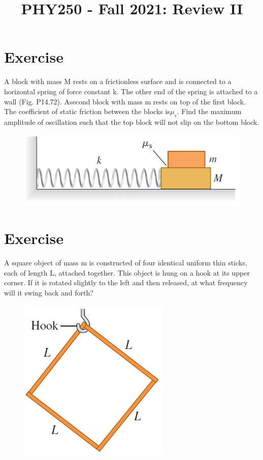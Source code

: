 \documentclass[12pt]{article}
\title{PHY250 - Fall 2021: Review II}
\author{}
\date{}
\begin{document}
\maketitle






\setcounter{example}{1}
\section*{Exercise \theexample}

A block with mass M rests on a frictionless surface
and is connected to a horizontal spring of force constant k. The
other end of the spring is attached to a wall (Fig. P14.72). Asecond
block with mass m rests on top of the first block. The coefficient of
static friction between the blocks is$\mu_s$. Find the maximum amplitude
of oscillation such that the top block will not slip on the bottom
block.

\begin{figure}[h!]
  \begin{center}
    \includegraphics[height=1.in]{images/4.jpg}
  \end{center}
\end{figure}


\section*{Exercise \theexample}


A square object of
mass m is constructed of four
identical uniform thin sticks, each
of length L, attached together.
This object is hung on a hook
at its upper corner.
If it is rotated slightly to the
left and then released, at what
frequency will it swing back and
forth?

\begin{figure}[h!]
  \begin{center}
    \includegraphics[height=2.in]{images/3.jpg}
  \end{center}
\end{figure}
\end{document}
